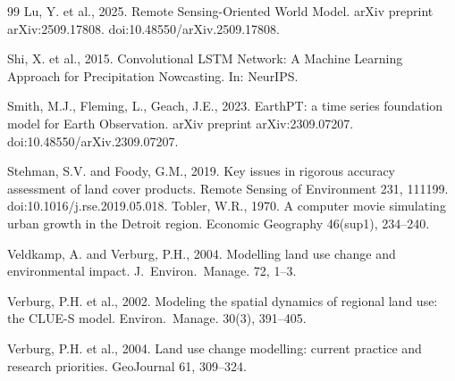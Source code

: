 \documentclass{article}
\begin{document}
\begin{thebibliography}{99}
Lu, Y. et al., 2025. Remote Sensing-Oriented World Model. arXiv preprint arXiv:2509.17808. doi:10.48550/arXiv.2509.17808.

Shi, X. et al., 2015. Convolutional LSTM Network: A Machine Learning Approach for Precipitation Nowcasting. In: NeurIPS.

Smith, M.J., Fleming, L., Geach, J.E., 2023. EarthPT: a time series foundation model for Earth Observation. arXiv preprint arXiv:2309.07207. doi:10.48550/arXiv.2309.07207.

Stehman, S.V. and Foody, G.M., 2019. Key issues in rigorous accuracy assessment of land cover products. Remote Sensing of Environment 231, 111199. doi:10.1016/j.rse.2019.05.018.
Tobler, W.R., 1970. A computer movie simulating urban growth in the Detroit region. Economic Geography 46(sup1), 234--240.

Veldkamp, A. and Verburg, P.H., 2004. Modelling land use change and environmental impact. J.~Environ.~Manage. 72, 1--3.

Verburg, P.H. et al., 2002. Modeling the spatial dynamics of regional land use: the CLUE-S model. Environ.~Manage. 30(3), 391--405.

Verburg, P.H. et al., 2004. Land use change modelling: current practice and research priorities. GeoJournal 61, 309--324.

\end{thebibliography}
\end{document}
